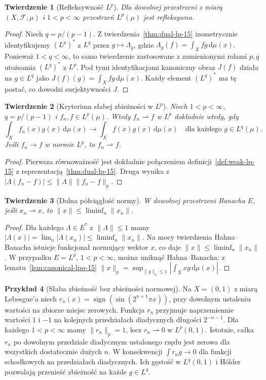 \documentclass[11pt,a4paper,oneside]{book}
\numberwithin{equation}{chapter}
\theoremstyle{plain}
\newtheorem{twierdzenie}{Twierdzenie}[chapter]
\theoremstyle{definition}
\newtheorem{przyklad}[twierdzenie]{Przykład}
\theoremstyle{remark}
\begin{document}
\begin{twierdzenie}[Refleksywność $L^p$]
\label{thm:reflexive-lp-15}
Dla dowolnej przestrzeni z miarą $(X,\mathcal F,\mu)$
i $1<p<\infty$ przestrzeń $L^p(\mu)$ jest refleksywna.
\end{twierdzenie}
\begin{proof}
Niech $q=p/(p-1)$. Z twierdzenia~\ref{thm:dual-lp-15}
izometrycznie identyfikujemy $(L^p)^*$ z $L^q$ przez
$g\mapsto\Lambda_g$, gdzie $\Lambda_g(f)=\int_Xfg\,\mathrm d\mu(x)$.
Ponieważ $1<q<\infty$, to samo twierdzenie zastosowane
z zamienionymi rolami $p,q$ utożsamia $(L^q)^*$ z $L^p$.
Pod tymi identyfikacjami kanoniczny obraz $J(f)$
działa na $g\in L^q$ jako $J(f)(g)=\int_Xfg\,\mathrm d\mu(x)$.
Każdy element $(L^q)^*$ ma tę postać, co dowodzi
surjektywności $J$.
\end{proof}

\begin{twierdzenie}[Kryterium słabej zbieżności w $L^p$]
\label{thm:weak-lp-15}
Niech $1<p<\infty$, $q=p/(p-1)$ i $f_n,f\in L^p(\mu)$.
Wtedy $f_n\rightharpoonup f$ w $L^p$ dokładnie wtedy, gdy
\[
\int_Xf_n(x)g(x)\,\mathrm d\mu(x)
\longrightarrow\int_Xf(x)g(x)\,\mathrm d\mu(x)
\quad\text{dla każdego }g\in L^q(\mu).
\]
Jeśli $f_n\to f$ w normie $L^p$, to $f_n\rightharpoonup f$.
\end{twierdzenie}
\begin{proof}
Pierwsza równoważność jest dokładnie połączeniem
definicji~\ref{def:weak-lp-15} z
reprezentacją~\ref{thm:dual-lp-15}.
Druga wynika z $|\Lambda(f_n-f)|\le\|\Lambda\|\|f_n-f\|_p$.
\end{proof}

\begin{twierdzenie}[Dolna półciągłość normy]
\label{thm:weak-lsc-15}
W dowolnej przestrzeni Banacha $E$, jeśli $x_n\rightharpoonup x$,
to $\|x\|\le\liminf_n\|x_n\|$.
\end{twierdzenie}
\begin{proof}
Dla każdego $\Lambda\in E^*$ z $\|\Lambda\|\le1$
mamy $|\Lambda(x)|=\lim_n|\Lambda(x_n)|
\le\liminf_n\|x_n\|$.
Na mocy twierdzenia Hahna--Banacha istnieje
funkcjonał normujący wektor $x$, co daje
$\|x\|\le\liminf_n\|x_n\|$.
W przypadku $E=L^p$, $1<p<\infty$, można uniknąć
Hahna--Banacha: z lematu~\ref{lem:canonical-lpq-15}
$\|x\|_p=\sup_{\|g\|_q\le1}|\int_Xxg\,\mathrm d\mu(x)|$.
\end{proof}

\begin{przyklad}[Słaba zbieżność bez zbieżności normowej]
Na $X=(0,1)$ z miarą Lebesgue'a niech
$r_n(x)=\operatorname{sign}(\sin(2^{n+1}\pi x))$,
przy dowolnym ustaleniu wartości na zbiorze miejsc zerowych.
Funkcja $r_n$ przyjmuje naprzemiennie wartości $1$ i $-1$
na kolejnych przedziałach diadycznych długości $2^{-n-1}$.
Dla każdego $1<p<\infty$ mamy $\|r_n\|_p=1$, lecz
$r_n\rightharpoonup0$ w $L^p(0,1)$. Istotnie, całka
$r_n$ po dowolnym przedziale diadycznym ustalonego
rzędu jest zerowa dla wszystkich dostatecznie dużych $n$.
W konsekwencji $\int r_ng\to0$ dla funkcji schodkowych
na przedziałach diadycznych. Ich gęstość w $L^q(0,1)$
i Hölder pozwalają przenieść zbieżność na każde $g\in L^q$.
\end{przyklad}
\end{document}
